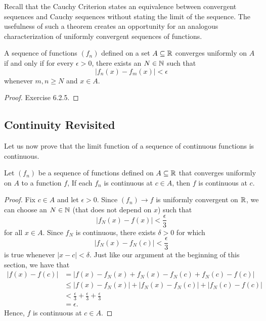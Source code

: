 Recall that the Cauchy Criterion states an equivalence between convergent sequences and Cauchy sequences without stating the limit of the sequence. The usefulness of such a theorem creates an opportunity for an analogous  characterization of uniformly convergent sequences of functions.

\begin{theorem}
    A sequence of functions \( (f_n)  \) defined on a set \( A \subseteq \mathbb{R}  \) converges uniformly on \( A  \) if and only if for every \( \epsilon > 0  \), there exists an \( N \in \mathbb{N}  \) such that 
    \[  | f_n(x) - f_m(x)  | < \epsilon  \]
    whenever \( m,n \geq N  \) and \( x \in A  \).
    \end{theorem}
\begin{proof}
Exercise 6.2.5.
\end{proof}

\subsection{Continuity Revisited}

Let us now prove that the limit function of a sequence of continuous functions is continuous.

\begin{theorem}
    Let \( (f_n)  \) be a sequence of functions defined on \( A \subseteq \mathbb{R}  \) that converges uniformly on \( A  \) to a function \( f  \), If each \( f_n   \) is continuous at \( c \in A  \), then \( f  \) is continuous at \( c  \).
    \end{theorem}

\begin{proof}
Fix \( c \in A  \) and let \( \epsilon > 0  \). Since \( (f_n) \to f   \) is uniformly convergent on \( \mathbb{R}  \), we can choose an \( N \in \mathbb{N}   \) (that does not depend on \( x  \)) such that 
\[  | f_N(x) - f(x)  | < \frac{ \epsilon  }{ 3  }  \]
for all \( x \in A  \). Since \( f_N  \) is continuous, there exists \( \delta > 0  \) for which 
\[  | f_N(x) - f_N(c)  | < \frac{ \epsilon  }{ 3 }  \]
is true whenever \( | x - c  | < \delta  \). Just like our argument at the beginning of this section, we have that
\begin{align*}
    | f(x) - f(c)  | &= | f(x) - f_N(x) + f_N(x) - f_N(c) + f_N(c) - f(c)  |  \\
                     &\leq | f(x) - f_N(x)  | + | f_N(x) - f_N(c)  | + | f_N(c) - f(c)  | \\
                     &< \frac{ \epsilon  }{ 3  } + \frac{ \epsilon  }{ 3 } + \frac{ \epsilon  }{ 3  } \\
                     &= \epsilon.
\end{align*}
Hence, \( f  \) is continuous at \( c \in  A  \).
\end{proof}




